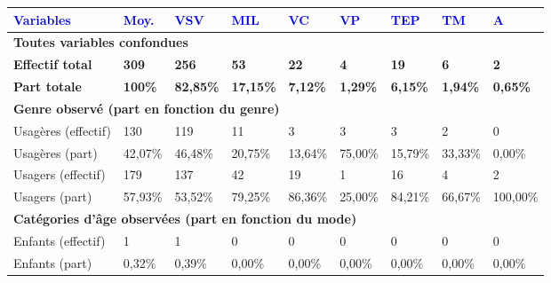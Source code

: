         \begin{longtable}{p{3.7cm}p{0.9cm}p{0.9cm}p{0.9cm}p{0.9cm}p{0.9cm}p{0.9cm}p{0.9cm}p{0.9cm}}
         \textcolor{blue}{\textbf{Variables}} & \textcolor{blue}{\textbf{Moy.}} & \textcolor{blue}{\textbf{VSV}} & \textcolor{blue}{\textbf{MIL}} & \textcolor{blue}{\textbf{VC}} & \textcolor{blue}{\textbf{VP}} & \textcolor{blue}{\textbf{TEP}} & \textcolor{blue}{\textbf{TM}} & \textcolor{blue}{\textbf{A}}\\
        \hline
        \endhead       
\multicolumn{9}{l}{\textbf{Toutes variables confondues}}\\
    \small{\textbf{Effectif total}} & \small{\textbf{309}} & \small{\textbf{256}} & \small{\textbf{53}} & \small{\textbf{22}} & \small{\textbf{4}} & \small{\textbf{19}} & \small{\textbf{6}} & \small{\textbf{2}}\\    
    \small{\textbf{Part totale}} & \small{\textbf{100\%}} & \small{\textbf{82,85\%}} & \small{\textbf{17,15\%}} & \small{\textbf{7,12\%}} & \small{\textbf{1,29\%}} & \small{\textbf{6,15\%}} & \small{\textbf{1,94\%}} & \small{\textbf{0,65\%}}\\
    \hline    
\multicolumn{9}{l}{\textbf{Genre observé (part en fonction du genre)}}\\
    \small{Usagères (effectif)} & \small{130} & \small{119} & \small{11} & \small{3} & \small{3} & \small{3} & \small{2} & \small{0}\\    
    \small{Usagères (part)} & \small{42,07\%} & \small{46,48\%} & \small{20,75\%} & \small{13,64\%} & \small{75,00\%} & \small{15,79\%} & \small{33,33\%} & \small{0,00\%}\\    
    \small{Usagers (effectif)} & \small{179} & \small{137} & \small{42} & \small{19} & \small{1} & \small{16} & \small{4} & \small{2}\\    
    \small{Usagers (part)} & \small{57,93\%} & \small{53,52\%} & \small{79,25\%} & \small{86,36\%} & \small{25,00\%} & \small{84,21\%} & \small{66,67\%} & \small{100,00\%}\\
    \hline    
\multicolumn{9}{l}{\textbf{Catégories d'âge observées (part en fonction du mode)}}\\
    \small{Enfants (effectif)} & \small{1} & \small{1} & \small{0} & \small{0} & \small{0} & \small{0} & \small{0} & \small{0}\\    
    \small{Enfants (part)} & \small{0,32\%} & \small{0,39\%} & \small{0,00\%} & \small{0,00\%} & \small{0,00\%} & \small{0,00\%} & \small{0,00\%} & \small{0,00\%}\\    

\end{longtable}
